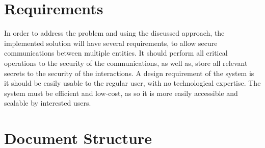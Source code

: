 
\section{Requirements} \label{chap:intro:requirements}

In order to address the problem and using the discussed approach, the implemented solution will have several requirements, to allow secure communications between multiple entities.
It should perform all critical operations to the security of the communications, as well as, store all relevant secrets to the security of the interactions.
A design requirement of the system is it should be easily usable to the regular user, with no technological expertise. The system must be efficient and low-cost, as so it is more easily accessible and scalable by interested users.


\section{Document Structure} \label{chap:intro:doc}
